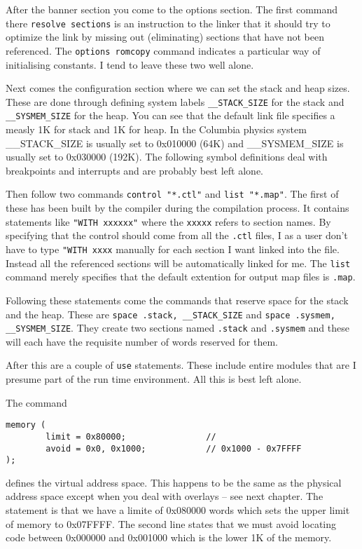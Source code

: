 After the banner section you come to the options section. The first command
there {\tt resolve sections} is an instruction to the linker that it
should try to optimize the link by missing out (eliminating) sections
that have not been referenced. The {\tt options romcopy} command indicates
a particular way of initialising constants. I tend to leave these two well
alone.

Next comes the configuration section where we can set the stack and heap
sizes. These are done through defining system labels {\tt \_\_STACK\_SIZE}
for the stack and {\tt \_\_SYSMEM\_SIZE} for the heap. You can see that
the default link file specifies a measly 1K for stack and 1K for heap.
In the Columbia physics system {\_\_STACK\_SIZE} is usually set to 0x010000
(64K) and {\_\_SYSMEM\_SIZE} is usually set to 0x030000 (192K).
The following symbol definitions deal with breakpoints and interrupts and 
are probably best left alone. 

Then follow two commands {\tt control "*.ctl"} and {\tt list "*.map"}.
The first of these has been built by the compiler during the compilation
process. It contains statements like {\tt "WITH xxxxxx"} where
the {\tt xxxxx} refers to section names. By specifying that the control should
come from all the {\tt .ctl} files, I as a user don't have to type {\tt "WITH xxxx} manually for each section I want linked into the file. Instead all the 
referenced sections will be automatically linked for me. The {\tt list} 
command merely specifies that the default extention for output map files
is {\tt .map}.

Following these statements come the commands that reserve space
for the stack and the heap. These are {\tt space .stack, \_\_STACK\_SIZE}
and {\tt space .sysmem, \_\_SYSMEM\_SIZE}. They create two sections named
{\tt .stack} and {\tt .sysmem} and these will each have the requisite number
of words reserved for them.

After this are a couple of {\tt use} statements. These include entire modules
that are I presume part of the run time environment. All this is best left
alone.

The command 
\begin{verbatim}
memory (
        limit = 0x80000;                //
        avoid = 0x0, 0x1000;            // 0x1000 - 0x7FFFF
);
\end{verbatim}
defines the virtual address space. This happens to be the same as the
physical address space except when you deal with overlays -- see next chapter.
The statement is that we have a limite of 0x080000 words which sets the 
upper limit of memory to 0x07FFFF. The second line states that we must
avoid locating code between 0x000000 and 0x001000 which is the lower 1K
of the memory.

